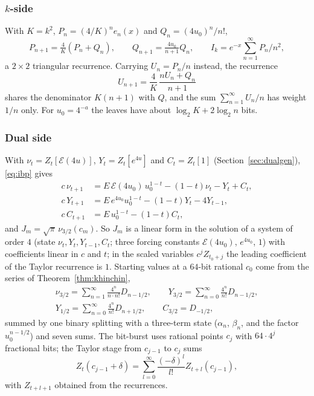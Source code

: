 \documentclass[11pt,reqno]{amsart}
\theoremstyle{definition}
\theoremstyle{remark}
\newcommand{\Eip}{\mathcal{E}}
\begin{document}
\subsubsection{$k$-side} With $K = k^2$, $P_n = (4/K)^ne_n(x)$ and $Q_n = (4u_0)^n/n!$,
\[
  P_{n+1} = \tfrac4K(P_n + Q_n), \qquad Q_{n+1} = \tfrac{4u_0}{n+1}Q_n, \qquad I_k = e^{-x}\sum_{n=1}^{\infty}P_n/n^2,
\]
a $2\times2$ triangular recurrence. Carrying $U_n = P_n/n$ instead, the recurrence
\[
  U_{n+1} = \frac{4}{K}\,\frac{nU_n + Q_n}{n+1}
\]
shares the denominator $K(n+1)$ with $Q$, and the sum $\sum_{n=1}^{\infty} U_n/n$ has weight $1/n$ only. For $u_0 = 4^{-a}$ the
leaves have about $\log_2 K + 2\log_2 n$ bits.

\subsubsection{Dual side} With $\nu_t = Z_t[\Eip(4u)]$, $Y_t = Z_t[e^{4u}]$ and $C_t = Z_t[1]$ (Section~\ref{sec:dualgen}),
\eqref{eq:ibp} gives
\begin{align*}
  c\,\nu_{t+1} &= E\,\Eip(4u_0)\,u_0^{1-t} - (1-t)\nu_t - Y_t + C_t, \\
  c\,Y_{t+1} &= E\,e^{4u_0}u_0^{1-t} - (1-t)Y_t - 4Y_{t-1}, \\
  c\,C_{t+1} &= E\,u_0^{1-t} - (1-t)C_t,
\end{align*}
and $J_m = \sqrt\pi\,\nu_{3/2}(c_m)$. So $J_m$ is a linear form in the solution of a system of order $4$
(state $\nu_t, Y_t, Y_{t-1}, C_t$; three forcing constants $\Eip(4u_0)$, $e^{4u_0}$, $1$) with coefficients
linear in $c$ and $t$; in the scaled variables $c^jZ_{t_0+j}$ the leading coefficient of the Taylor recurrence is $1$.
Starting values at a $64$-bit rational $c_0$ come from the series of Theorem~\ref{thm:khinchin},
\begin{gather*}
  \nu_{3/2} = \sum_{n=1}^{\infty}\frac{4^n}{n\cdot n!}D_{n-1/2}, \qquad Y_{3/2} = \sum_{n=0}^{\infty}\frac{4^n}{n!}D_{n-1/2}, \\
  Y_{1/2} = \sum_{n=0}^{\infty}\frac{4^n}{n!}D_{n+1/2}, \qquad C_{3/2} = D_{-1/2},
\end{gather*}
summed by one binary splitting with a three-term state ($\alpha_n$, $\beta_n$, and the factor $u_0^{n-1/2}$) and
seven sums. The bit-burst uses rational points $c_j$ with $64\cdot4^j$ fractional bits; the Taylor stage from
$c_{j-1}$ to $c_j$ sums
\[
  Z_t(c_{j-1}+\delta) = \sum_{l=0}^{\infty}\frac{(-\delta)^l}{l!}Z_{t+l}(c_{j-1}),
\]
with $Z_{t+l+1}$ obtained from the recurrences.
\end{document}
